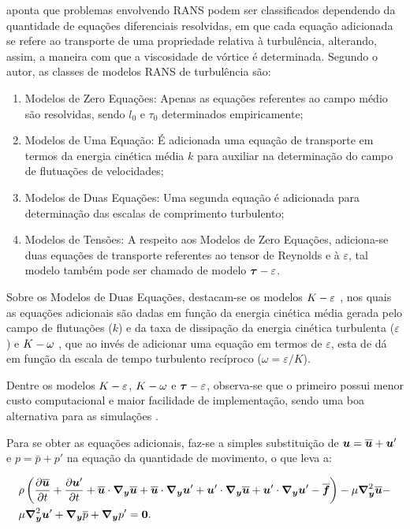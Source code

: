  aponta que problemas envolvendo RANS podem ser classificados dependendo da quantidade de equações diferenciais resolvidas, em que cada equação adicionada se refere ao transporte de uma propriedade relativa à turbulência, alterando, assim, a maneira com que a viscosidade de vórtice é determinada. Segundo o autor, as classes de modelos RANS de turbulência são:

\begin{enumerate}[label=\alph*.]
    \item Modelos de Zero Equações: Apenas as equações referentes ao campo médio são resolvidas, sendo $l_0$ e $\tau_0$ determinados empiricamente;
    \item Modelos de Uma Equação: É adicionada uma equação de transporte em termos da energia cinética média $k$ para auxiliar na determinação do campo de flutuações de velocidades;
    \item Modelos de Duas Equações: Uma segunda equação é adicionada para determinação das escalas de comprimento turbulento;
    \item Modelos de Tensões: A respeito aos Modelos de Zero Equações, adiciona-se duas equações de transporte referentes ao tensor de Reynolds e à $\varepsilon$, tal modelo também pode ser chamado de modelo $\boldsymbol{\tau}-\varepsilon$.
\end{enumerate}

Sobre os Modelos de Duas Equações, destacam-se os modelos $K-\varepsilon$ \cite{haakansson2012experimental,davidson2014pans,parente2011improved}, nos quais as equações adicionais são dadas em função da energia cinética média gerada pelo campo de flutuações ($k$) e da taxa de dissipação da energia cinética turbulenta ($\varepsilon$) e $K-\omega$ \cite{larsen2018over,bassi2005discontinuous}, que ao invés de adicionar uma equação em termos de $\varepsilon$, esta de dá em função da escala de tempo turbulento recíproco ($\omega=\varepsilon/K$).

Dentre os modelos $K-\varepsilon$, $K-\omega$ e $\boldsymbol{\tau}-\varepsilon$, observa-se que o primeiro possui menor custo computacional e maior facilidade de implementação, sendo uma boa alternativa para as simulações \cite{koutsourakis2012evaluation,adanta2020comparison}.

Para se obter as equações adicionais, faz-se a simples substituição de $\boldsymbol{u}=\overline{\boldsymbol{u}}+\boldsymbol{u}'$ e $p=\bar{p}+p'$ na equação da quantidade de movimento, o que leva a:

\begin{equation}
    \begin{split}
        &\rho\left({\frac{\partial{\overline{\boldsymbol{u}}}}{\partial t}+\frac{\partial{\boldsymbol{u}'}}{\partial t}+\overline{\boldsymbol{u}}\cdot\boldsymbol{\nabla_y}\overline{\boldsymbol{u}}+\overline{\boldsymbol{u}}\cdot\boldsymbol{\nabla_y}\boldsymbol{u}'+\boldsymbol{u}'\cdot\boldsymbol{\nabla_y}\overline{\boldsymbol{u}}+\boldsymbol{u}'\cdot\boldsymbol{\nabla_y}\boldsymbol{u}'-\overline{\boldsymbol{f}}}\right)-\mu\boldsymbol{\nabla}^2_{\boldsymbol{y}}\overline{\boldsymbol{u}}-\\
        &\mu\boldsymbol{\nabla}^2_{\boldsymbol{y}}\boldsymbol{u}'+\boldsymbol{\nabla_y}\overline{p}+\boldsymbol{\nabla_y} p'=\boldsymbol{0}\text{.}
    \end{split}
    \label{eq:NS-RANS1}
\end{equation}

